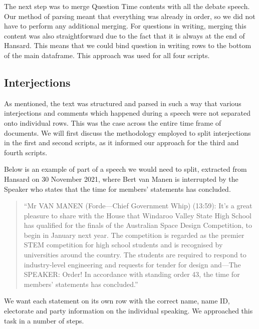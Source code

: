 \documentclass[
  letterpaper,
  DIV=11,
  numbers=noendperiod]{scrartcl}
\begin{document}
The next step was to merge Question Time contents with all the debate
speech. Our method of parsing meant that everything was already in
order, so we did not have to perform any additional merging. For
questions in writing, merging this content was also straightforward due
to the fact that it is always at the end of Hansard. This means that we
could bind question in writing rows to the bottom of the main dataframe.
This approach was used for all four scripts.

\hypertarget{sec-interject}{%
\subsection{Interjections}\label{sec-interject}}

As mentioned, the text was structured and parsed in such a way that
various interjections and comments which happened during a speech were
not separated onto individual rows. This was the case across the entire
time frame of documents. We will first discuss the methodology employed
to split interjections in the first and second scripts, as it informed
our approach for the third and fourth scripts.

Below is an example of part of a speech we would need to split,
extracted from Hansard on 30 November 2021, where Bert van Manen is
interrupted by the Speaker who states that the time for members'
statements has concluded.

\begin{quote}
\end{quote}

\begin{quote}
``Mr VAN MANEN (Forde---Chief Government Whip) (13:59): It's a great
pleasure to share with the House that Windaroo Valley State High School
has qualified for the finals of the Australian Space Design Competition,
to begin in January next year. The competition is regarded as the
premier STEM competition for high school students and is recognised by
universities around the country. The students are required to respond to
industry-level engineering and requests for tender for design and---The
SPEAKER: Order! In accordance with standing order 43, the time for
members' statements has concluded.''
\end{quote}

We want each statement on its own row with the correct name, name ID,
electorate and party information on the individual speaking. We
approached this task in a number of steps.
\end{document}
